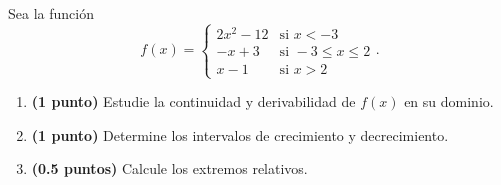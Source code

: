 
Sea la función
\[
f(x)=\begin{cases}2x^2-12&\text{si }x<-3\\-x+3&\text{si }-3\leq x\leq2\\x-1&\text{si }x>2\end{cases}.
\]
\begin{enumerate}[label=\alph*)]
\item \textbf{(1 punto)} Estudie la continuidad y derivabilidad de $f(x)$ en su dominio.
\item \textbf{(1 punto)} Determine los intervalos de crecimiento y decrecimiento.
\item \textbf{(0.5 puntos)} Calcule los extremos relativos.
\end{enumerate}
